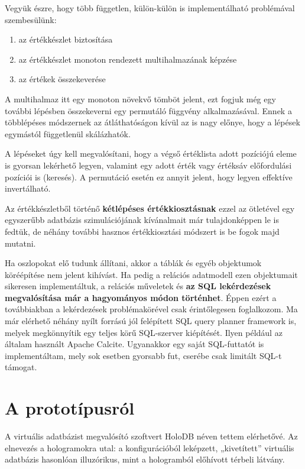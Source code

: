 \documentclass[
    parspace,
    noindent,
    nohyp,
]{elteiktdk}[2023/04/10]
\begin{document}
Vegyük észre, hogy több független, külön-külön is implementálható problémával szembesülünk:

\begin{enumerate}
    \item az értékkészlet biztosítása
    \item az értékkészlet monoton rendezett multihalmazának képzése
    \item az értékek összekeverése
\end{enumerate}

A multihalmaz itt egy monoton növekvő tömböt jelent,
ezt fogjuk még egy további lépésben összekeverni egy permutáló függvény alkalmazásával.
Ennek a többlépéses módszernek az átláthatóságon kívül az is nagy előnye,
hogy a lépések egymástól függetlenül skálázhatók.

A lépéseket úgy kell megvalósítani, hogy a végső értéklista adott pozíciójú eleme is gyorsan lekérhető legyen,
valamint egy adott érték vagy értéksáv előfordulási pozíciói is
(keresés).
A permutáció esetén ez annyit jelent, hogy legyen effektíve invertálható.

Az értékkészletből történő \textbf{kétlépéses értékkiosztásnak} ezzel az ötletével
egy egyszerűbb adatbázis szimulációjának kívánalmait már tulajdonképpen le is fedtük,
de néhány további hasznos értékkiosztási módszert is be fogok majd mutatni.

Ha oszlopokat elő tudunk állítani,
akkor a táblák és egyéb objektumok köréépítése nem jelent kihívást.
Ha pedig a relációs adatmodell ezen objektumait sikeresen implementáltuk,
a relációs műveletek és \textbf{az SQL lekérdezések megvalósítása már a hagyományos módon történhet}.
Éppen ezért a továbbiakban a lekérdezések problémakörével csak érintőlegesen foglalkozom.
Ma már elérhető néhány nyílt forrású jól felépített SQL query planner framework is,
melyek megkönnyítik egy teljes körű SQL-szerver kiépítését.
Ilyen például az általam használt Apache Calcite.
Ugyanakkor egy saját SQL-futtatót is implementáltam, mely sok esetben gyorsabb fut,
cserébe csak limitált SQL-t támogat.


\section{A prototípusról}

A virtuális adatbázist megvalósító szoftvert HoloDB néven tettem elérhetővé.
Az elnevezés a hologramokra utal:
a konfigurációból leképzett, „kivetített” virtuális adatbázis hasonlóan illuzórikus,
mint a hologramból előhívott térbeli látvány.
\end{document}
